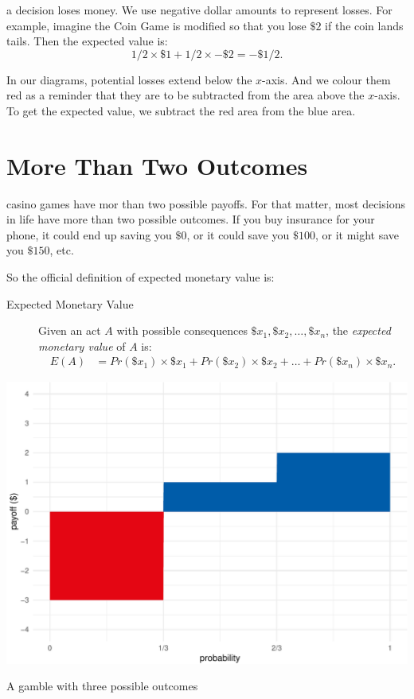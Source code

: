 \documentclass[justified]{tufte-book}
\newcommand{\p}{Pr}
\newcommand{\E}{E}
\theoremstyle{definition}
\theoremstyle{definition}
\theoremstyle{definition}
\theoremstyle{remark}
\begin{document}
 a decision loses money. We use negative dollar amounts to represent losses. For example, imagine the Coin Game is modified so that you lose \(\$2\) if the coin lands tails. Then the expected value is:
\[ 1/2 \times \$1 + 1/2 \times -\$2 = -\$1/2.\]

In our diagrams, potential losses extend below the \(x\)-axis. And we colour them red as a reminder that they are to be subtracted from the area above the \(x\)-axis. To get the expected value, we subtract the red area from the blue area.

\hypertarget{more-than-two-outcomes}{%
\section{More Than Two Outcomes}\label{more-than-two-outcomes}}

 casino games have mor than two possible payoffs. For that matter, most decisions in life have more than two possible outcomes. If you buy insurance for your phone, it could end up saving you \(\$0\), or it could save you \(\$100\), or it might save you \(\$150\), etc.

So the official definition of expected monetary value is:

\begin{description}
\item[Expected Monetary Value]
Given an act \(A\) with possible consequences \(\$x_1, \$x_2, \ldots, \$x_n\), the \emph{expected monetary value} of \(A\) is:
\[
  \begin{aligned}
\E(A) &= \p(\$x_1) \times \$x_1 + \p(\$x_2) \times \$x_2 + \ldots + \p(\$x_n) \times \$x_n.
  \end{aligned}
\]
\end{description}

\begin{marginfigure}
\includegraphics{_main_files/figure-latex/unnamed-chunk-96-1} \caption[A gamble with three possible outcomes]{A gamble with three possible outcomes}\label{fig:unnamed-chunk-96}
\end{marginfigure}
\end{document}
